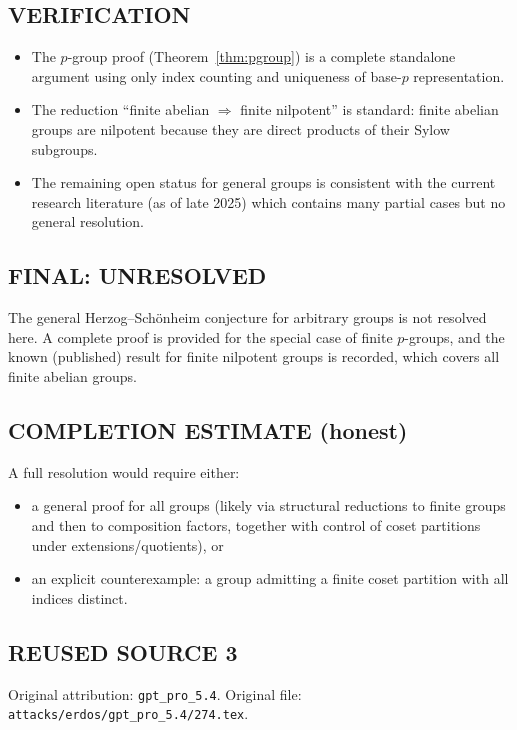 \subsection*{VERIFICATION}
\begin{itemize}
\item The $p$-group proof (Theorem~\ref{thm:pgroup}) is a complete standalone argument using only index counting and uniqueness of base-$p$ representation.
\item The reduction ``finite abelian $\Rightarrow$ finite nilpotent'' is standard: finite abelian groups are nilpotent because they are direct products of their Sylow subgroups.
\item The remaining open status for general groups is consistent with the current research literature (as of late 2025) which contains many partial cases but no general resolution.
\end{itemize}

\subsection*{FINAL: UNRESOLVED}
The general Herzog--Sch\"onheim conjecture for arbitrary groups is not resolved here.
A complete proof is provided for the special case of finite $p$-groups, and the known (published) result for finite nilpotent groups is recorded, which covers all finite abelian groups.

\subsection*{COMPLETION ESTIMATE (honest)}
A full resolution would require either:
\begin{itemize}
\item a general proof for all groups (likely via structural reductions to finite groups and then to composition factors, together with control of coset partitions under extensions/quotients), or
\item an explicit counterexample: a group admitting a finite coset partition with all indices distinct.
\end{itemize}





\subsection*{REUSED SOURCE 3}
Original attribution: \texttt{gpt\_pro\_5.4}.
Original file: \texttt{attacks/erdos/gpt\_pro\_5.4/274.tex}.

